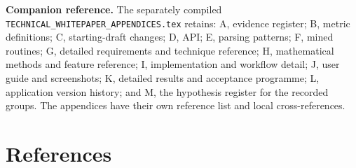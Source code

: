 \documentclass[11pt,a4paper]{article}
\begin{document}
\textbf{Companion reference.} The separately compiled \nolinkurl{TECHNICAL_WHITEPAPER_APPENDICES.tex} retains: A, evidence register; B, metric definitions; C, starting-draft changes; D, API; E, parsing patterns; F, mined routines; G, detailed requirements and technique reference; H, mathematical methods and feature reference; I, implementation and workflow detail; J, user guide and screenshots; K, detailed results and acceptance programme; L, application version history; and M, the hypothesis register for the recorded groups. The appendices have their own reference list and local cross-references.


\clearpage
\section{References}
\end{document}
